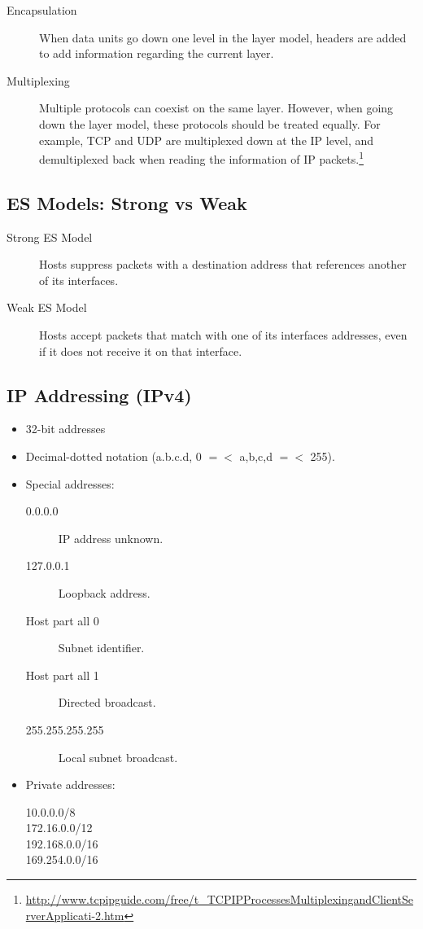 \documentclass{article}
\begin{document}
\begin{description}
	\item[Encapsulation] When data units go down one level in the layer model, headers are added to add information regarding the current layer.
	\item[Multiplexing] Multiple protocols can coexist on the same layer. However, when going down the layer model, these protocols should be treated equally. For example, TCP and UDP are multiplexed down at the IP level, and demultiplexed back when reading the information of IP packets.\footnote{\url{http://www.tcpipguide.com/free/t_TCPIPProcessesMultiplexingandClientServerApplicati-2.htm}}
\end{description}


\subsection{ES Models: Strong vs Weak}

\begin{description}
	\item[Strong ES Model] Hosts suppress packets with a destination address that references another of its interfaces.
	\item[Weak ES Model] Hosts accept packets that match with one of its interfaces addresses, even if it does not receive it on that interface.
\end{description}


\subsection{IP Addressing (IPv4)}

\begin{itemize}
	\item 32-bit addresses
	\item Decimal-dotted notation (a.b.c.d, 0 $=<$ a,b,c,d $=<$ 255).
	\item Special addresses:
	\begin{description}
		\item[0.0.0.0] IP address unknown.
		\item[127.0.0.1] Loopback address.
		\item[Host part all 0] Subnet identifier.
		\item[Host part all 1] Directed broadcast.
		\item[255.255.255.255] Local subnet broadcast.
	\end{description}
	\item Private addresses:
	\begin{description}
		\item[10.0.0.0/8] 
		\item[172.16.0.0/12]
		\item[192.168.0.0/16]
		\item[169.254.0.0/16]
	\end{description}
\end{itemize}
\end{document}
